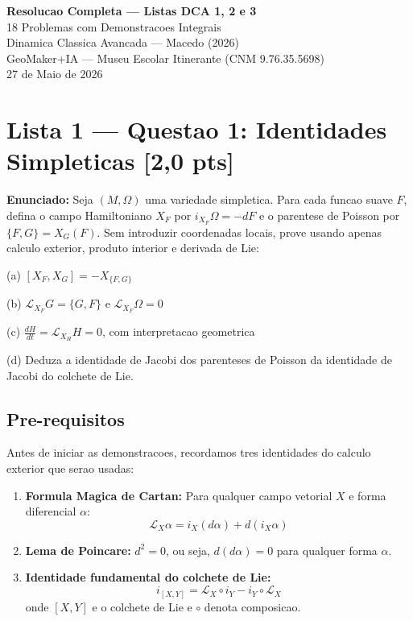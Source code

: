\documentclass[12pt,a4paper,oneside]{article}
\begin{document}
\begin{center}
{\LARGE \textbf{Resolucao Completa — Listas DCA 1, 2 e 3}}\\[12pt]
{\large 18 Problemas com Demonstracoes Integrais}\\[6pt]
{\large Dinamica Classica Avancada — Macedo (2026)}\\[6pt]
{\large GeoMaker+IA — Museu Escolar Itinerante (CNM 9.76.35.5698)}\\[6pt]
{\large 27 de Maio de 2026}
\end{center}
\thispagestyle{empty}
\newpage

\section{Lista 1 — Questao 1: Identidades Simpleticas [2,0 pts]}

\textbf{Enunciado:} Seja $(M,\Omega)$ uma variedade simpletica. Para cada
funcao suave $F$, defina o campo Hamiltoniano $X_F$ por $i_{X_F}\Omega=-dF$
e o parentese de Poisson por $\{F,G\}=X_G(F)$. Sem introduzir coordenadas
locais, prove usando apenas calculo exterior, produto interior e derivada
de Lie:

(a) $[X_F,X_G] = -X_{\{F,G\}}$

(b) $\mathcal{L}_{X_F}G = \{G,F\}$ e $\mathcal{L}_{X_F}\Omega = 0$

(c) $\frac{dH}{dt} = \mathcal{L}_{X_H}H = 0$, com interpretacao geometrica

(d) Deduza a identidade de Jacobi dos parenteses de Poisson da identidade
de Jacobi do colchete de Lie.

\subsection*{Pre-requisitos}

Antes de iniciar as demonstracoes, recordamos tres identidades do calculo
exterior que serao usadas:

\begin{enumerate}[label=\textbf{(I\arabic*)}, leftmargin=*]
  \item \textbf{Formula Magica de Cartan:} Para qualquer campo vetorial $X$
        e forma diferencial $\alpha$:
        $$\mathcal{L}_X\alpha = i_X(d\alpha) + d(i_X\alpha)$$
  \item \textbf{Lema de Poincare:} $d^2 = 0$, ou seja, $d(d\alpha)=0$ para
        qualquer forma $\alpha$.
  \item \textbf{Identidade fundamental do colchete de Lie:}
        $$i_{[X,Y]} = \mathcal{L}_X \circ i_Y - i_Y \circ \mathcal{L}_X$$
        onde $[X,Y]$ e o colchete de Lie e $\circ$ denota composicao.
\end{enumerate}
\end{document}
